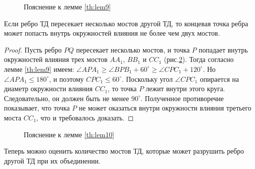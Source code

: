 \documentclass[12pt]{article}
\begin{document}
\begin{figure}[htb!]
	\caption{Пояснение к лемме \ref{th:lem9}}
	\label{pic:lem9}
\end{figure}

\begin{lemma}
\label{th:lem10}
Если ребро ТД пересекает несколько мостов другой ТД, то концевая точка ребра может попасть внутрь окружностей влияния не более чем двух мостов.
\end{lemma}

\begin{proof}
Пусть ребро $PQ$ пересекает несколько мостов, и точка $P$ попадает внутрь окружностей влияния трех мостов $AA_1$, $BB_1$ и $CC_1$ (рис.\ref{pic:lem10}).
Тогда согласно лемме \ref{th:lem9} имеем: $\angle APA_1 \ge \angle BPB_1 + 60^\circ \ge \angle CPC_1 + 120^\circ$.
Но $\angle APA_1 \le 180^\circ$, и поэтому $CPC_1 \le 60^\circ$.
Поскольку угол $\angle CPC_1$ опирается на диаметр окружности влияния $CC_1$, то  точка $P$ лежит внутри этого круга.
Следовательно, он должен быть не менее $90^\circ$.
Полученное противоречие показывает, что точка $P$ не может оказаться внутри окружности влияния третьего моста $CC_1$, что и требовалось доказать. 
\end{proof}

\begin{figure}[htb!]
	\caption{Пояснение к лемме \ref{th:lem10}}
	\label{pic:lem10}
\end{figure}

Теперь можно оценить количество мостов ТД, которые может разрушить ребро другой ТД при их объединении.
\end{document}
